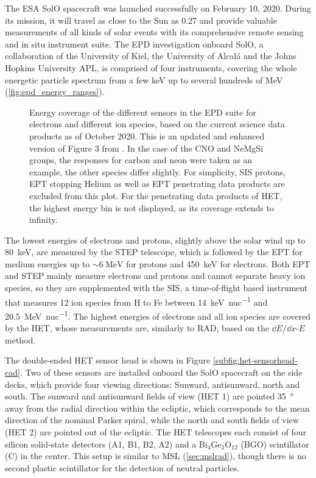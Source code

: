 The ESA \acl{SolO} spacecraft \citep[\acs{SolO},][]{Mueller-2020-SolO} was launched successfully on February 10, 2020. During its mission, it will travel as close to the Sun as \SI{0.27}{\AU} and provide valuable measurements of all kinds of solar events with its comprehensive remote sensing and in situ instrument suite. The \acl{EPD} investigation \citep[\acs{EPD},][]{RodriguezPacheco-2019-EPD} onboard \ac{SolO}, a collaboration of the University of Kiel, the University of Alcalá and the Johns Hopkins University APL, is comprised of four instruments, covering the whole energetic particle spectrum from a few \si{\kilo\electronvolt} up to several hundreds of \si{\mega\electronvolt} (\autoref{fig:epd_energy_ranges}).
\begin{figure}
	\centering
	
	\caption[\acs{EPD} energy coverage]{Energy coverage of the different sensors in the \ac{EPD} suite for electrons and different ion species, based on the current science data products as of October 2020. This is an updated and enhanced version of Figure 3 from \citet{RodriguezPacheco-2019-EPD}. In the case of the CNO and NeMgSi groups, the responses for carbon and neon were taken as an example, the other species differ slightly. For simplicity, \ac{SIS} protons, \ac{EPT} stopping Helium as well as \ac{EPT} penetrating data products are excluded from this plot. For the penetrating data products of \ac{HET}, the highest energy bin \citep[as given by][Appendix A]{Elftmann-2020-PhD} is not displayed, as its coverage extends to infinity.}
	\label{fig:epd_energy_ranges}
\end{figure}
The lowest energies of electrons and protons, slightly above the solar wind up to \SI{80}{\kilo\electronvolt}, are measured by the \ac{STEP} telescope, which is followed by the \ac{EPT} for medium energies up to $\sim\SI{6}{\mega\electronvolt}$ for protons and \SI{450}{\kilo\electronvolt} for electrons. Both \ac{EPT} and \ac{STEP} mainly measure electrons and protons and cannot separate heavy ion species, so they are supplemented with the \ac{SIS}, a time-of-flight based instrument that measures 12 ion species from H to Fe between \SI{14}{\kilo\electronvolt\per nuc} and \SI{20.5}{\mega\electronvolt\per nuc}. The highest energies of electrons and all ion species are covered by the \ac{HET}, whose measurements are, similarly to \ac{RAD}, based on the $\dd E/\dd x$-$E$ method.

The double-ended \ac{HET} sensor head is shown in Figure \ref{subfig:het-sensorhead-cad}. Two of these sensors are installed onboard the \ac{SolO} spacecraft on the side decks, which provide four viewing directions: Sunward, antisunward, north and south. The sunward and antisunward fields of view (HET 1) are pointed \SI{35}{\degree} away from the radial direction within the ecliptic, which corresponds to the mean direction of the nominal Parker spiral, while the north and south fields of view (HET 2) are pointed out of the ecliptic. The \ac{HET} telescopes each consist of four silicon solid-state detectors (A1, B1, B2, A2) and a Bi$_4$Ge$_3$O$_{12}$ (BGO) scintillator (C) in the center. This setup is similar to \ac{MSL} (\autoref{sec:mslrad}), though there is no second plastic scintillator for the detection of neutral particles.

